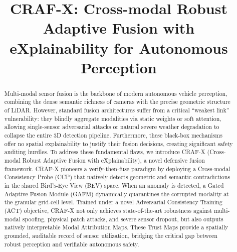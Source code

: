 \documentclass[runningheads]{llncs}
\theoremstyle{plain}
\begin{document}
%
\title{CRAF-X: Cross-modal Robust Adaptive Fusion with eXplainability for Autonomous Perception}

\maketitle              %

\begin{abstract}
Multi-modal sensor fusion is the backbone of modern autonomous vehicle perception, combining the dense semantic richness of cameras with the precise geometric structure of LiDAR. However, standard fusion architectures suffer from a critical ``weakest link'' vulnerability: they blindly aggregate modalities via static weights or soft attention, allowing single-sensor adversarial attacks or natural severe weather degradation to collapse the entire 3D detection pipeline. Furthermore, these black-box mechanisms offer no spatial explainability to justify their fusion decisions, creating significant safety auditing hurdles. To address these fundamental flaws, we introduce CRAF-X (Cross-modal Robust Adaptive Fusion with eXplainability), a novel defensive fusion framework. CRAF-X pioneers a verify-then-fuse paradigm by deploying a Cross-modal Consistency Probe (CCP) that natively detects geometric and semantic contradictions in the shared Bird's-Eye View (BEV) space. When an anomaly is detected, a Gated Adaptive Fusion Module (GAFM) dynamically quarantines the corrupted modality at the granular grid-cell level. Trained under a novel Adversarial Consistency Training (ACT) objective, CRAF-X not only achieves state-of-the-art robustness against multi-modal spoofing, physical patch attacks, and severe sensor dropout, but also outputs natively interpretable Modal Attribution Maps. These Trust Maps provide a spatially grounded, auditable record of sensor utilization, bridging the critical gap between robust perception and verifiable autonomous safety.

\end{abstract}









\end{document}

